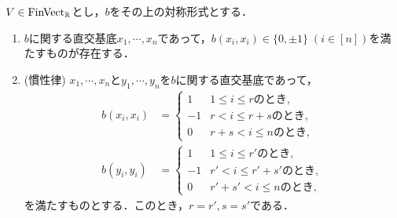 \documentclass[uplatex,dvipdfmx]{jsreport}
\begin{document}
\begin{proposition}
    $V\in\mathrm{FinVect}_{\mathbb{R}}$とし，$b$をその上の対称形式とする．
    \begin{enumerate}
        \item $b$に関する直交基底$x_1,\cdots,x_n$であって，$b(x_i,x_i)\in\{0,\pm 1\}\;(i\in[n])$を満たすものが存在する．
        \item (慣性律) $x_1,\cdots,x_n$と$y_1,\cdots,y_n$を$b$に関する直交基底であって，
        \begin{align*}
            b(x_i,x_i)&=\begin{cases}
                1&1\le i\le rのとき,\\
                -1&r<i\le r+sのとき,\\
                0&r+s<i\le nのとき,
            \end{cases}\\
            b(y_i,y_i)&=\begin{cases}
                1&1\le i\le r'のとき,\\
                -1&r'<i\le r'+s'のとき,\\
                0&r'+s'<i\le nのとき,
            \end{cases}
        \end{align*}
        を満たすものとする．このとき，$r=r',s=s'$である．
    \end{enumerate}
\end{proposition}
\end{document}
